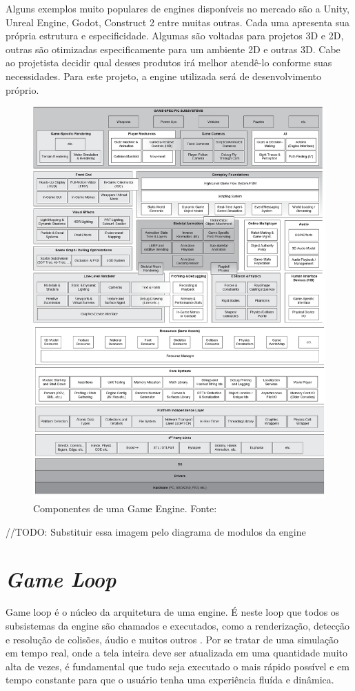 \documentclass[12pt, 
openright, 
oneside, 
a4paper,    
brazil]{facom-ufu-abntex2}
\begin{document}
Alguns exemplos muito populares de engines disponíveis no mercado são a Unity, Unreal Engine, Godot, Construct 2 entre muitas outras. Cada uma apresenta sua própria estrutura e especificidade. Algumas são voltadas para projetos 3D e 2D, outras são otimizadas especificamente para um ambiente 2D e outras 3D. Cabe ao projetista decidir qual desses produtos irá melhor atendê-lo conforme suas necessidades. Para este projeto, a engine utilizada será de desenvolvimento próprio.

\begin{figure}[H]
	\centering
	\includegraphics[width=\textwidth]{imagens/engine_layers.png}
	\caption{Componentes de uma Game Engine. Fonte:~\cite{GameEngineArchitecture}
    \label{fig:arquitetura}}
\end{figure}

//TODO: Substituir essa imagem pelo diagrama de modulos da engine 

\section{\textit{Game Loop}}
Game loop é o núcleo da arquitetura de uma engine. É neste loop que todos os subsistemas da engine são chamados e  executados, como a renderização, detecção e resolução de colisões, áudio e muitos outros \cite{GameEngineArchitecture}. Por se tratar de uma simulação em tempo real, onde a tela inteira deve ser atualizada em uma quantidade muito alta de vezes, é fundamental que tudo seja executado o mais rápido possível e em tempo constante para que o usuário tenha uma experiência fluída e dinâmica.
\end{document}
